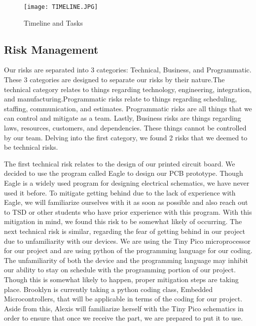 \documentclass{article}
\begin{document}
\begin{figure}[ht!]
\centering
\texttt{[image: TIMELINE.JPG]}
\caption{Timeline and Tasks}
\label{fig:timeline}
\end{figure}

\subsection{Risk Management}
Our risks are separated into 3 categories: Technical, Business, and Programmatic. These 3 categories are designed to separate our risks by their nature.The technical category relates to things regarding technology, engineering, integration, and manufacturing.Programmatic risks relate to things regarding scheduling, staffing, communication, and estimates. Programmatic risks are all things that we can control and mitigate as a team. Lastly, Business risks are things regarding laws, resources, customers, and dependencies. These things cannot be controlled by our team. Delving into the first category, we found 2 risks that we deemed to be technical risks. 



 The first technical risk relates to the design of our printed circuit board. We decided to use the program called Eagle to design our PCB prototype. Though Eagle is a widely used program for designing electrical schematics, we have never used it before. To mitigate getting behind due to the lack of experience with Eagle, we will familiarize ourselves with it as soon as possible and also reach out to TSD or other students who have prior experience with this program. With this mitigation in mind, we found this risk to be somewhat likely of occurring. The next technical risk is similar, regarding the fear of getting behind in our project due to unfamiliarity with our devices. We are using the Tiny Pico microprocessor for our project and are using python of the programming language for our coding. The unfamiliarity of both the device and the programming language may inhibit our ability to stay on schedule with the programming portion of our project. Though this is somewhat likely to happen, proper mitigation steps are taking place. Brooklyn is currently taking a python coding class, Embedded Microcontrollers, that will be applicable in terms of the coding for our project. Aside from this, Alexis will familiarize herself with the Tiny Pico schematics in order to ensure that once we receive the part, we are prepared to put it to use. 
\end{document}
